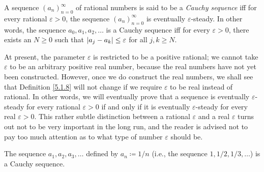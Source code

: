 \setcounter{theorem}{7}
\begin{definition}\label{5.1.8}
A sequence \((a_n)_{n = 0}^{\infty}\) of rational numbers is said to be a \emph{Cauchy sequence} iff for every rational \(\varepsilon > 0\), the sequence \((a_n)_{n = 0}^{\infty}\) is eventually \(\varepsilon\)-steady.
In other words, the sequence \(a_0, a_1, a_2, \dots\) is a Cauchy sequence iff for every \(\varepsilon > 0\), there exists an \(N \geq 0\) such that \(\abs*{a_j - a_k} \leq \varepsilon\) for all \(j, k \geq N\).
\end{definition}

\begin{remark}\label{5.1.9}
At present, the parameter \(\varepsilon\) is restricted to be a positive rational;
we cannot take \(\varepsilon\) to be an arbitrary positive real number, because the real numbers have not yet been constructed.
However, once we do construct the real numbers, we shall see that Definition \ref{5.1.8} will not change if we require \(\varepsilon\) to be real instead of rational.
In other words, we will eventually prove that a sequence is eventually \(\varepsilon\)-steady for every rational \(\varepsilon > 0\) if and only if it is eventually \(\varepsilon\)-steady for every real \(\varepsilon > 0\).
This rather subtle distinction between a rational \(\varepsilon\) and a real \(\varepsilon\) turns out not to be very important in the long run, and the reader is advised not to pay too much attention as to what type of number \(\varepsilon\) should be.
\end{remark}

\setcounter{theorem}{10}
\begin{proposition}\label{5.1.11}
The sequence \(a_1, a_2, a_3, \dots\) defined by \(a_n \coloneqq 1 / n\) (i.e., the sequence \(1, 1 / 2, 1 / 3, \dots\)) is a Cauchy sequence.
\end{proposition}

